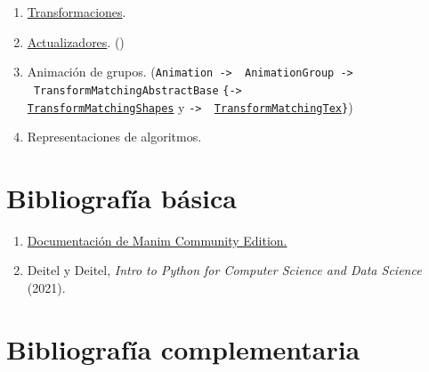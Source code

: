 \documentclass[a4paper]{article}
\begin{document}
\begin{enumerate}

    \item \href{https://docs.manim.community/en/v0.16.0.post0/reference/manim.animation.transform.html#module-manim.animation.transform}{Transformaciones}. 

    \item \href{https://docs.manim.community/en/v0.16.0.post0/reference/manim.animation.updaters.html#module-manim.animation.updaters}{Actualizadores}. ()

    \item Animación de grupos. (\texttt{Animation -> \ AnimationGroup -> \ TransformMatchingAbstractBase} \texttt{\{-> \\ \href{https://docs.manim.community/en/v0.16.0.post0/reference/manim.animation.transform_matching_parts.TransformMatchingShapes.html?highlight=TransformMatchingShapes}{TransformMatchingShapes}} y \texttt{-> \ \href{https://docs.manim.community/en/v0.16.0.post0/reference/manim.animation.transform_matching_parts.TransformMatchingTex.html?highlight=TransformMatchingTex}{TransformMatchingTex}\}})

    \item Representaciones de algoritmos.

\end{enumerate}

\section*{Bibliografía básica} \label{Sec: Bibliografía básica}

\begin{enumerate}

    \item \href{https://docs.manim.community/en/stable/index.html}{Documentación de Manim Community Edition.}


    \item Deitel y Deitel,  \emph{Intro to Python for Computer Science and Data Science} (2021).
\end{enumerate}

\section*{Bibliografía complementaria} \label{Sec: Bibliografía complementaria}
\end{document}
